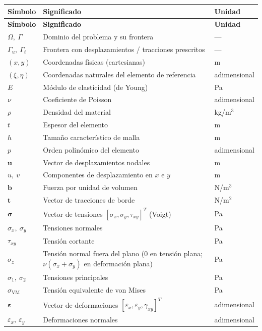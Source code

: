 \renewcommand{\arraystretch}{1.2}
\begin{longtable}{@{}p{2.4cm}p{8.4cm}p{3.0cm}@{}}
\toprule
\textbf{Símbolo} & \textbf{Significado} & \textbf{Unidad} \\
\midrule
\endfirsthead
\toprule
\textbf{Símbolo} & \textbf{Significado} & \textbf{Unidad} \\
\midrule
\endhead
\bottomrule
\endfoot
$\Omega,\ \Gamma$ & Dominio del problema y su frontera & --- \\
$\Gamma_u,\ \Gamma_t$ & Frontera con desplazamientos / tracciones prescritos & --- \\
$(x,y)$ & Coordenadas físicas (cartesianas) & m \\
$(\xi,\eta)$ & Coordenadas naturales del elemento de referencia & adimensional \\
$E$ & Módulo de elasticidad (de Young) & Pa \\
$\nu$ & Coeficiente de Poisson & adimensional \\
$\rho$ & Densidad del material & kg/m$^3$ \\
$t$ & Espesor del elemento & m \\
$h$ & Tamaño característico de malla & m \\
$p$ & Orden polinómico del elemento & adimensional \\
$\bm{u}$ & Vector de desplazamientos nodales & m \\
$u,\ v$ & Componentes de desplazamiento en $x$ e $y$ & m \\
$\bm{b}$ & Fuerza por unidad de volumen & N/m$^3$ \\
$\bm{t}$ & Vector de tracciones de borde & N/m$^2$ \\
$\bm{\sigma}$ & Vector de tensiones $[\sigma_x,\sigma_y,\tau_{xy}]^T$ (Voigt) & Pa \\
$\sigma_x,\ \sigma_y$ & Tensiones normales & Pa \\
$\tau_{xy}$ & Tensión cortante & Pa \\
$\sigma_z$ & Tensión normal fuera del plano ($0$ en tensión plana; $\nu(\sigma_x+\sigma_y)$ en deformación plana) & Pa \\
$\sigma_1,\ \sigma_2$ & Tensiones principales & Pa \\
$\sigma_{\mathrm{VM}}$ & Tensión equivalente de von Mises & Pa \\
$\bm{\varepsilon}$ & Vector de deformaciones $[\varepsilon_x,\varepsilon_y,\gamma_{xy}]^T$ & adimensional \\
$\varepsilon_x,\ \varepsilon_y$ & Deformaciones normales & adimensional \\

\end{longtable}
